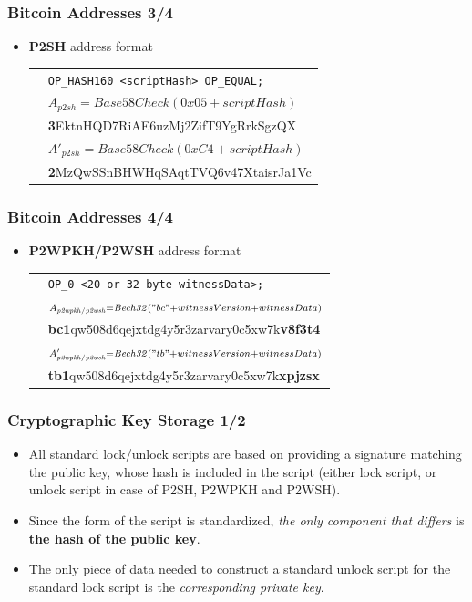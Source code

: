 \documentclass{beamer}
\begin{document}
\begin{frame}
  \frametitle{Bitcoin Addresses 3/4}
  \begin{itemize}
  \item \textbf{P2SH} address format
    \break
    \begin{tabular}{rl}
      &\tiny\texttt{OP_HASH160 <scriptHash> OP_EQUAL;} \\
      &${\scriptstyle A_{\mathit{p2sh}} = \mathit{Base58Check}(0x05 +
        scriptHash)}$ \\
      &{\scriptsize \quad\quad\quad \textbf{3}EktnHQD7RiAE6uzMj2ZifT9YgRrkSgzQX} \\
      &${\scriptstyle A'_{\mathit{p2sh}} = \mathit{Base58Check}(0xC4 +
        scriptHash)}$ \\
      &{\scriptsize \quad\quad\quad \textbf{2}MzQwSSnBHWHqSAqtTVQ6v47XtaisrJa1Vc} \\
    \end{tabular}
  \end{itemize}
\end{frame}

\begin{frame}
  \frametitle{Bitcoin Addresses 4/4}
  \begin{itemize}
  \item \textbf{P2WPKH/P2WSH} address format
    \break
    \begin{tabular}{rl}
      &\tiny\texttt{OP_0 <20-or-32-byte witnessData>;} \\
      &${\scriptstyle A_{\mathit{p2wpkh/p2wsh}} = \mathit{Bech32}("bc" +
        witnessVersion + witnessData)}$ \\
      &{\scriptsize \quad\quad\quad \textbf{bc1}qw508d6qejxtdg4y5r3zarvary0c5xw7k\textbf{v8f3t4}} \\
      &${\scriptstyle A'_{\mathit{p2wpkh/p2wsh}} = \mathit{Bech32}("tb" +
        witnessVersion + witnessData)}$ \\
      &{\scriptsize \quad\quad\quad \textbf{tb1}qw508d6qejxtdg4y5r3zarvary0c5xw7k\textbf{xpjzsx}} \\
    \end{tabular}
  \end{itemize}
\end{frame}

\begin{frame}
  \frametitle{Cryptographic Key Storage 1/2}
  \begin{itemize}
  \item All standard lock/unlock scripts are based on providing a signature
    matching the public key, whose hash is included in the script (either lock
    script, or unlock script in case of P2SH, P2WPKH and P2WSH).
  \item Since the form of the script is standardized, \textit{the only component
      that differs} is \textbf{the hash of the public key}.
  \item The only piece of data needed to construct a standard unlock script for
    the standard lock script is the \textit{corresponding private key}.
  \end{itemize}
\end{frame}
\end{document}
